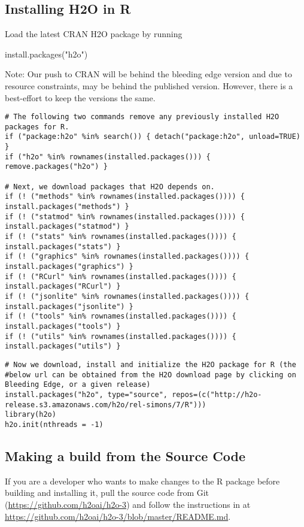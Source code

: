 \subsection{Installing H2O in R}

Load the latest CRAN H2O package by running \begin{spverbatim} install.packages("h2o") \end{spverbatim} 

Note: Our push to CRAN will be behind the bleeding edge version and due to resource constraints, may be behind the published version. However, there is a best-effort to keep the versions the same. 

\begin{lstlisting}[style=R]
# The following two commands remove any previously installed H2O packages for R.
if ("package:h2o" %in% search()) { detach("package:h2o", unload=TRUE) }
if ("h2o" %in% rownames(installed.packages())) { remove.packages("h2o") }

# Next, we download packages that H2O depends on.
if (! ("methods" %in% rownames(installed.packages()))) { install.packages("methods") }
if (! ("statmod" %in% rownames(installed.packages()))) { install.packages("statmod") }
if (! ("stats" %in% rownames(installed.packages()))) { install.packages("stats") }
if (! ("graphics" %in% rownames(installed.packages()))) { install.packages("graphics") }
if (! ("RCurl" %in% rownames(installed.packages()))) { install.packages("RCurl") }
if (! ("jsonlite" %in% rownames(installed.packages()))) { install.packages("jsonlite") }
if (! ("tools" %in% rownames(installed.packages()))) { install.packages("tools") }
if (! ("utils" %in% rownames(installed.packages()))) { install.packages("utils") }
\end{lstlisting}


\begin{lstlisting}[style=R]
# Now we download, install and initialize the H2O package for R (the
#below url can be obtained from the H2O download page by clicking on Bleeding Edge, or a given release)
install.packages("h2o", type="source", repos=(c("http://h2o-release.s3.amazonaws.com/h2o/rel-simons/7/R")))
library(h2o)
h2o.init(nthreads = -1)
\end{lstlisting}

\subsection{Making a build from the Source Code}
If you are a developer who wants to make changes to the R package before building and installing it, pull the source code from Git ({\url{https://github.com/h2oai/h2o-3}}) and follow the instructions in at {\url{https://github.com/h2oai/h2o-3/blob/master/README.md}}.

